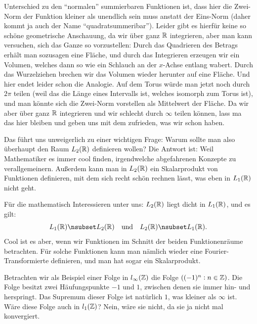 \begin{remark}
Unterschied zu den \enquote{normalen} summierbaren Funktionen ist, dass hier die Zwei-Norm der
Funktion kleiner als unendlich sein muss anstatt der Eins-Norm (daher kommt ja auch der Name
\enquote{quadratsummeribar}). Leider gibt es hierfür keine so schöne geometrische Anschauung, da wir
über ganz $ \mathbb{R} $ integrieren, aber man kann versuchen, sich das Ganze so vorzustellen: Durch das
Quadrieren des Betrags erhält man sozusagen eine Fläche, und durch das Integrieren erzeugen wir
ein Volumen, welches dann so wie ein Schlauch an der $ x $-Achse entlang wabert. Durch das 
Wurzelziehen brechen wir das Volumen wieder herunter auf eine Fläche. Und hier endet leider schon
die Analogie. Auf dem Torus würde man jetzt noch durch $ 2\pi $ teilen (weil das die Länge eines
Intervalls ist, welches isomorph zum Torus ist), und man könnte sich die Zwei-Norm vorstellen als
Mittelwert der Fläche. Da wir aber über ganz $ \mathbb{R} $ integrieren und wir schlecht durch $ \infty $
teilen können, lass ma das hier bleiben und geben uns mit dem zufrieden, was wir schon haben. 

Das führt uns unweigerlich zu einer wichtigen Frage: Warum sollte man also überhaupt den Raum $ 
L_{2}(\mathbb{R}) $ definieren wollen? Die Antwort ist: Weil Mathematiker es immer cool finden, 
irgendwelche abgefahrenen Konzepte zu verallgemeinern. Außerdem kann man in $ L_{2}(\mathbb{R}) $ ein 
Skalarprodukt von Funktionen definieren, mit dem sich recht schön rechnen lässt, was eben in 
$ L_{1}(\mathbb{R}) $ nicht geht.

Für die mathematisch Interessieren unter uns: $ L_{2}(\mathbb{R}) $ liegt dicht in $ L_{1}(\mathbb{R}) $, und es
gilt:
\[
  L_{1}(\R) \nsubset L_{2}(\R) \quad \text{und} \quad L_{2}(\R) \nsubset L_{1}(\R).
\]
Cool ist es aber, wenn wir Funktionen im Schnitt der beiden Funktionenräume betrachten. Für solche
Funktionen kann man nämlich wieder eine Fourier-Transformierte definieren, und man hat sogar ein
Skalarprodukt.
\end{remark}

\begin{example}
Betrachten wir als Beispiel einer Folge in $ l_{\infty}(\mathbb{Z}) $ die Folge $ ((-1)^{n} : n \in \mathbb{Z}) $.
Die Folge besitzt zwei Häufungspunkte $ -1 $ und $ 1 $, zwischen denen sie immer hin- und 
herspringt. Das Supremum dieser Folge ist natürlich $ 1 $, was kleiner als $ \infty $ ist. Wäre 
diese Folge auch in $ l_{1}(\mathbb{Z}) $? Nein, wäre sie nicht, da sie ja nicht mal konvergiert.
\end{example}

